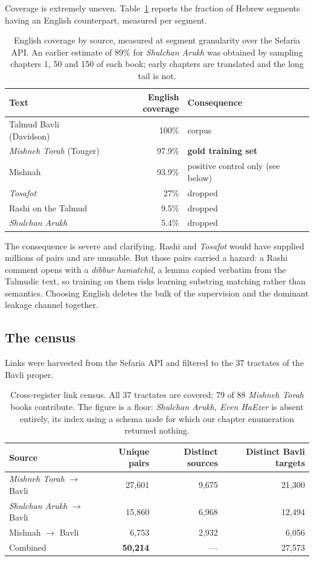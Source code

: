 \documentclass[11pt,a4paper]{article}
\begin{document}
Coverage is extremely uneven. Table~\ref{tab:coverage} reports the fraction of
Hebrew segments having an English counterpart, measured per segment.

\begin{table}[h]
\centering
\begin{tabular}{lrl}
\toprule
Text & English coverage & Consequence \\
\midrule
Talmud Bavli (Davidson) & 100\% & corpus \\
\emph{Mishneh Torah} (Touger) & 97.9\% & \textbf{gold training set} \\
Mishnah & 93.9\% & positive control only (see below) \\
\emph{Tosafot} & 27\% & dropped \\
Rashi on the Talmud & 9.5\% & dropped \\
\emph{Shulchan Arukh} & 5.4\% & dropped \\
\bottomrule
\end{tabular}
\caption{English coverage by source, measured at segment granularity over the
Sefaria API. An earlier estimate of 89\% for \emph{Shulchan Arukh} was obtained
by sampling chapters 1, 50 and 150 of each book; early chapters are translated
and the long tail is not.}
\label{tab:coverage}
\end{table}

The consequence is severe and clarifying. Rashi and \emph{Tosafot} would have
supplied millions of pairs and are unusable. But those pairs carried a hazard:
a Rashi comment opens with a \emph{dibbur hamatchil}, a lemma copied verbatim
from the Talmudic text, so training on them risks learning substring matching
rather than semantics. Choosing English deletes the bulk of the supervision and
the dominant leakage channel together.

\subsection{The census}

Links were harvested from the Sefaria API and filtered to the 37 tractates of
the Bavli proper.

\begin{table}[h]
\centering
\begin{tabular}{lrrr}
\toprule
Source & Unique pairs & Distinct sources & Distinct Bavli targets \\
\midrule
\emph{Mishneh Torah} $\to$ Bavli & 27{,}601 & 9{,}675 & 21{,}300 \\
\emph{Shulchan Arukh} $\to$ Bavli & 15{,}860 & 6{,}968 & 12{,}494 \\
Mishnah $\to$ Bavli & 6{,}753 & 2{,}932 & 6{,}056 \\
\midrule
Combined & \textbf{50{,}214} & --- & 27{,}573 \\
\bottomrule
\end{tabular}
\caption{Cross-register link census. All 37 tractates are covered; 79 of 88
\emph{Mishneh Torah} books contribute. The figure is a floor: \emph{Shulchan
Arukh, Even HaEzer} is absent entirely, its index using a schema node for which
our chapter enumeration returned nothing.}
\label{tab:census}
\end{table}
\end{document}
